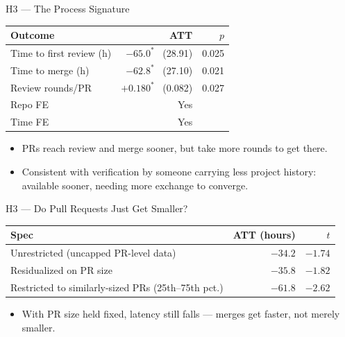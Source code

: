 \begin{frame}{H3 --- The Process Signature}
\begin{table}
\centering
\small
\begin{tabular}{lrr}
\toprule
Outcome & ATT & $p$ \\
\midrule
Time to first review (h) & $-65.0^{*}$ \ (28.91) & 0.025 \\
Time to merge (h)        & $-62.8^{*}$ \ (27.10) & 0.021 \\
Review rounds/PR         & $+0.180^{*}$ \ (0.082) & 0.027 \\
\addlinespace
Repo FE & Yes & \\
Time FE & Yes & \\
\bottomrule
\end{tabular}
\end{table}
\begin{itemize}
  \item PRs reach review and merge sooner, but take more rounds to get
        there.
  \item Consistent with verification by someone carrying less
        project history: available sooner, needing more exchange to
        converge.
\end{itemize}
\end{frame}

\begin{frame}{H3 --- Do Pull Requests Just Get Smaller?}
\begin{table}
\centering
\small
\begin{tabular}{lrr}
\toprule
Spec & ATT (hours) & $t$ \\
\midrule
Unrestricted (uncapped PR-level data) & $-34.2$ & $-1.74$ \\
Residualized on PR size & $-35.8$ & $-1.82$ \\
Restricted to similarly-sized PRs (25th--75th pct.) & $-61.8$ & $-2.62$ \\
\bottomrule
\end{tabular}
\end{table}
\begin{itemize}
  \item With PR size held fixed, latency still falls --- merges get
        faster, not merely smaller.
\end{itemize}
\end{frame}

